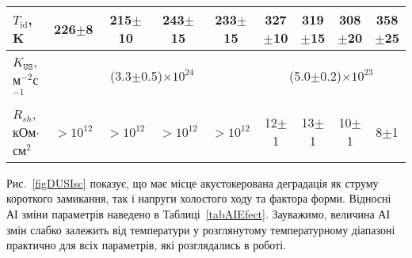 \begin{table}
\begin{tabular}{|l|c|c|c|c|c|c|c|c|}
$T_\mathrm{id}$, K&226$\pm$8&215$\pm$10&243$\pm$15&233$\pm$15&327$\pm$10&319$\pm$15&308$\pm$20&358$\pm$25\\ \hline
$K_\mathtt{US}$, м$^{-2}$с$^{-1}$&\multicolumn{4}{c|}{(3.3$\pm$0.5)$\times10^{24}$}&\multicolumn{4}{|c|}{(5.0$\pm$0.2)$\times10^{23}$}\\ \hline
$R_{sh}$, кОм$\cdot$см$^2$&$>10^{12}$&$>10^{12}$&$>10^{12}$&$>10^{12}$&12$\pm$1&13$\pm$1&10$\pm$1&8$\pm$1\\ \hline
\end{tabular}
\end{table}

Рис.~\ref{figDUSIsc} показує, що має місце акустокерована деградація як струму короткого замикання, так і напруги холостого ходу та
фактора форми.
Відносні АІ зміни  параметрів наведено в Таблиці~\ref{tabAIEfect}.
Зауважимо, величина АІ змін слабко залежить від температури у розглянутому температурному діапазоні практично для всіх параметрів, які розглядались в роботі.


